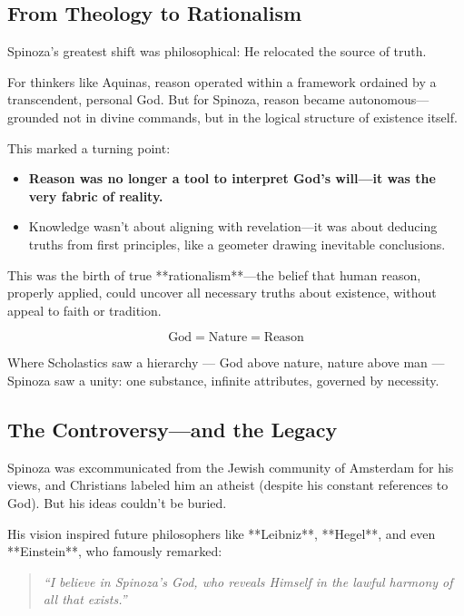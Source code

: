 \subsection*{From Theology to Rationalism}

Spinoza’s greatest shift was philosophical:  
He relocated the source of truth.

For thinkers like Aquinas, reason operated within a framework ordained by a transcendent, personal God. But for Spinoza, reason became autonomous—grounded not in divine commands, but in the logical structure of existence itself.

This marked a turning point:

\begin{itemize}
    \item \textbf{Reason was no longer a tool to interpret God’s will—it was the very fabric of reality.}
    \item Knowledge wasn’t about aligning with revelation—it was about deducing truths from first principles, like a geometer drawing inevitable conclusions.
\end{itemize}

This was the birth of true **rationalism**—the belief that human reason, properly applied, could uncover all necessary truths about existence, without appeal to faith or tradition.

\begin{tcolorbox}[colback=gray!5!white, colframe=black!75!white, title={Spinoza’s Radical Equation}]
\[
\boxed{\text{God} = \text{Nature} = \text{Reason}}
\]

Where Scholastics saw a hierarchy — God above nature, nature above man — Spinoza saw a unity: one substance, infinite attributes, governed by necessity.
\end{tcolorbox}

\subsection*{The Controversy—and the Legacy}

Spinoza was excommunicated from the Jewish community of Amsterdam for his views, and Christians labeled him an atheist (despite his constant references to God). But his ideas couldn’t be buried.

His vision inspired future philosophers like **Leibniz**, **Hegel**, and even **Einstein**, who famously remarked:

\begin{quote}
\textit{“I believe in Spinoza’s God, who reveals Himself in the lawful harmony of all that exists.”}
\end{quote}

